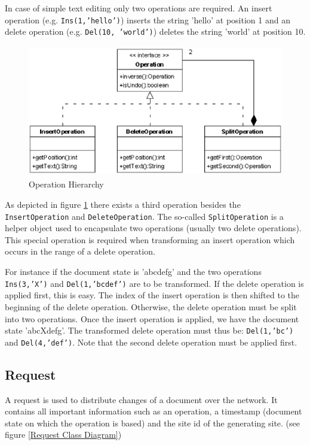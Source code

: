 In case of simple text editing only two operations are required. An insert 
operation (e.g. \texttt{Ins(1,'hello')}) inserts the string 'hello' at position 
1 and an delete operation (e.g. \texttt{Del(10, 'world')}) deletes the string 
'world' at position 10.

\begin{figure}[H]
\centering
\includegraphics[height=5.74cm,width=11.59cm]{../images/finalreport/algorithm_operation.eps}
\caption{Operation Hierarchy}
\label{Operation Hierarchy}
\end{figure}

\label{Split_Operation}
As depicted in figure \ref{Operation Hierarchy} there exists a third operation besides the \texttt{InsertOperation} and \texttt{DeleteOperation}. The so-called \texttt{SplitOperation} is a helper object used to encapsulate two operations (usually two delete operations). This special operation is required when transforming an insert operation which occurs in the range of a delete operation. 

For instance if the document state is 'abcdefg' and the two operations
\texttt{Ins(3,'X')} and \texttt{Del(1,'bcdef')} are to be transformed. If
the delete operation is applied first, this is easy. The index of the insert
operation is then shifted to the beginning of the delete operation. Otherwise,
the delete operation must be split into two operations. Once the insert
operation is applied, we have the document state 'abcXdefg'. The transformed
delete operation must thus be: \texttt{Del(1,'bc')} and \texttt{Del(4,'def')}.
Note that the second delete operation must be applied first.


\subsection{Request}
A request is used to distribute changes of a document over the network. It 
contains all important information such as an operation, a timestamp (document 
state on which the operation is based) and the site id of the generating site. 
(see figure \ref{Request Class Diagram})

